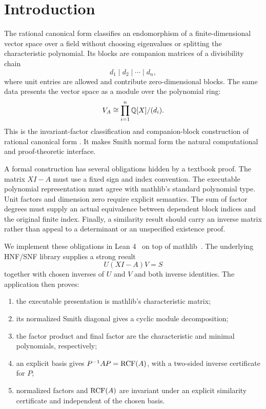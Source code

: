 \section{Introduction}

The rational canonical form classifies an endomorphism of a finite-dimensional
vector space over a field without choosing eigenvalues or splitting the
characteristic polynomial.  Its blocks are companion matrices of a
divisibility chain
\[
  d_1 \mid d_2 \mid \cdots \mid d_n,
\]
where unit entries are allowed and contribute zero-dimensional blocks.  The
same data presents the vector space as a module over the polynomial ring:
\[
  V_A \cong
  \prod_{i=1}^{n} \mathbb{Q}[X]/(d_i).
\]
This is the invariant-factor classification and companion-block construction
of rational canonical form \citep[Chapter VI]{macduffee1943rcf}.  It makes
Smith normal form the natural computational and proof-theoretic interface.

A formal construction has several obligations hidden by a textbook proof.
The matrix $XI-A$ must use a fixed sign and index convention.  The executable
polynomial representation must agree with mathlib's standard polynomial
type.  Unit factors and dimension zero require explicit semantics.  The sum
of factor degrees must supply an actual equivalence between dependent block
indices and the original finite index.  Finally, a similarity result should
carry an inverse matrix rather than appeal to a determinant or an unspecified
existence proof.

We implement these obligations in Lean 4~\citep{deMouraUllrich2021Lean4} on top of
mathlib~\citep{mathlib2020}.  The underlying HNF/SNF library supplies a strong
result
\[
  U(XI-A)V=S
\]
together with chosen inverses of $U$ and $V$ and both inverse identities.
The application then proves:

\begin{enumerate}
\item the executable presentation is mathlib's characteristic matrix;
\item its normalized Smith diagonal gives a cyclic module decomposition;
\item the factor product and final factor are the characteristic and minimal
  polynomials, respectively;
\item an explicit basis gives
  $P^{-1}AP=\operatorname{RCF}(A)$, with a two-sided inverse certificate for $P$;
\item normalized factors and $\operatorname{RCF}(A)$ are invariant under an explicit
  similarity certificate and independent of the chosen basis.
\end{enumerate}

